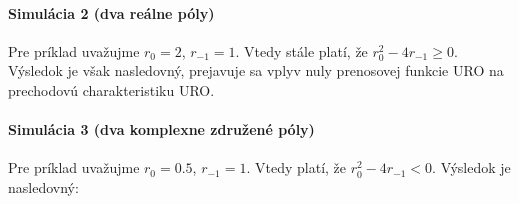 \documentclass[a4paper, 10pt, ]{article}
\begin{document}
\paragraph{Simulácia 2 (dva reálne póly)}

Pre príklad uvažujme $r_0 = 2$, $r_{-1} = 1$. Vtedy stále platí, že $r_0^2 - 4r_{-1} \geq 0$. Výsledok je však nasledovný, prejavuje sa vplyv nuly prenosovej funkcie URO na prechodovú charakteristiku URO.




\begin{center}




    \figcaption{}

\end{center}














\paragraph{Simulácia 3 (dva komplexne združené póly)}

Pre príklad uvažujme $r_0 = 0.5$, $r_{-1} = 1$. Vtedy  platí, že $r_0^2 - 4r_{-1} < 0$. Výsledok je nasledovný:


\begin{center}




    \figcaption{}

\end{center}
\end{document}
